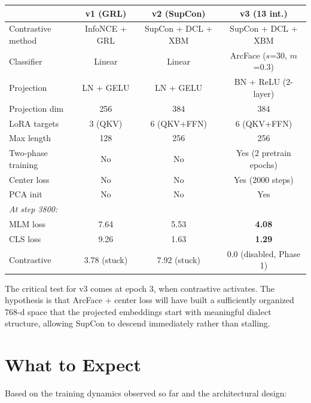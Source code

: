 \documentclass[11pt,a4paper]{article}
\theoremstyle{definition}
\begin{document}
\begin{center}
\renewcommand{\arraystretch}{1.3}
\begin{tabular}{l ccc}
\toprule
& \textbf{v1 (GRL)} & \textbf{v2 (SupCon)} & \textbf{v3 (13 int.)} \\
\midrule
Contrastive method & InfoNCE + GRL & SupCon + DCL + XBM & SupCon + DCL + XBM \\
Classifier & Linear & Linear & ArcFace ($s$=30, $m$=0.3) \\
Projection & LN + GELU & LN + GELU & BN + ReLU (2-layer) \\
Projection dim & 256 & 384 & 384 \\
LoRA targets & 3 (QKV) & 6 (QKV+FFN) & 6 (QKV+FFN) \\
Max length & 128 & 256 & 256 \\
Two-phase training & No & No & Yes (2 pretrain epochs) \\
Center loss & No & No & Yes (2000 steps) \\
PCA init & No & No & Yes \\
\midrule
\multicolumn{4}{l}{\textit{At step 3800:}} \\
MLM loss & 7.64 & 5.53 & \textbf{4.08} \\
CLS loss & 9.26 & 1.63 & \textbf{1.29} \\
Contrastive & 3.78 (stuck) & 7.92 (stuck) & 0.0 (disabled, Phase 1) \\
\bottomrule
\end{tabular}
\end{center}

The critical test for v3 comes at epoch 3, when contrastive activates.
The hypothesis is that ArcFace + center loss will have built a
sufficiently organized 768-d space that the projected embeddings start
with meaningful dialect structure, allowing SupCon to descend
immediately rather than stalling.

\section{What to Expect}
\label{sec:expectations}

Based on the training dynamics observed so far and the architectural
design:
\end{document}
